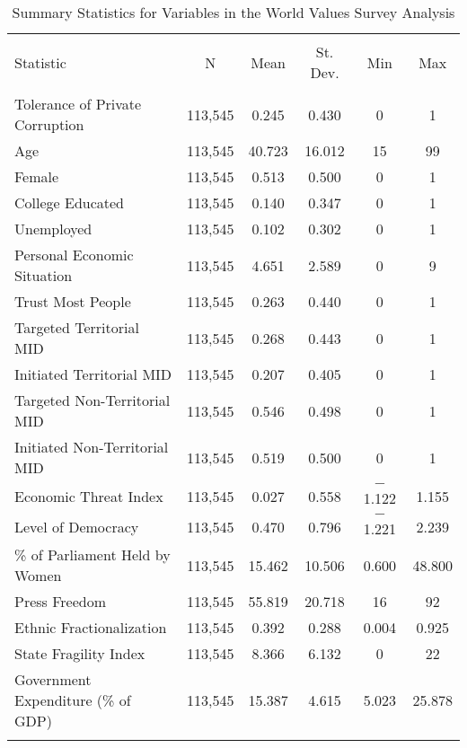 \documentclass[11pt,]{article}
\begin{document}
\begin{table}[!htbp] \centering 
  \caption{Summary Statistics for Variables in the World Values Survey Analysis} 
  \label{tab:summarywvs} 
\begin{tabular}{@{\extracolsep{5pt}}lccccc} 
\\[-1.8ex]\hline 
\hline \\[-1.8ex] 
Statistic & \multicolumn{1}{c}{N} & \multicolumn{1}{c}{Mean} & \multicolumn{1}{c}{St. Dev.} & \multicolumn{1}{c}{Min} & \multicolumn{1}{c}{Max} \\ 
\hline \\[-1.8ex] 
Tolerance of Private Corruption & 113,545 & 0.245 & 0.430 & 0 & 1 \\ 
Age & 113,545 & 40.723 & 16.012 & 15 & 99 \\ 
Female & 113,545 & 0.513 & 0.500 & 0 & 1 \\ 
College Educated & 113,545 & 0.140 & 0.347 & 0 & 1 \\ 
Unemployed & 113,545 & 0.102 & 0.302 & 0 & 1 \\ 
Personal Economic Situation & 113,545 & 4.651 & 2.589 & 0 & 9 \\ 
Trust Most People & 113,545 & 0.263 & 0.440 & 0 & 1 \\ 
Targeted Territorial MID & 113,545 & 0.268 & 0.443 & 0 & 1 \\ 
Initiated Territorial MID & 113,545 & 0.207 & 0.405 & 0 & 1 \\ 
Targeted Non-Territorial MID & 113,545 & 0.546 & 0.498 & 0 & 1 \\ 
Initiated Non-Territorial MID & 113,545 & 0.519 & 0.500 & 0 & 1 \\ 
Economic Threat Index & 113,545 & 0.027 & 0.558 & $-$1.122 & 1.155 \\ 
Level of Democracy & 113,545 & 0.470 & 0.796 & $-$1.221 & 2.239 \\ 
\% of Parliament Held by Women & 113,545 & 15.462 & 10.506 & 0.600 & 48.800 \\ 
Press Freedom & 113,545 & 55.819 & 20.718 & 16 & 92 \\ 
Ethnic Fractionalization & 113,545 & 0.392 & 0.288 & 0.004 & 0.925 \\ 
State Fragility Index & 113,545 & 8.366 & 6.132 & 0 & 22 \\ 
Government Expenditure (\% of GDP) & 113,545 & 15.387 & 4.615 & 5.023 & 25.878 \\ 
\hline \\[-1.8ex] 
\end{tabular} 
\end{table}




\newpage
\singlespacing 
\end{document}
